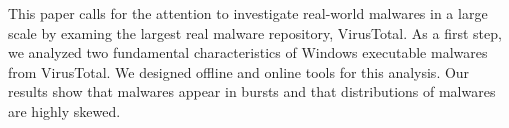 This paper calls for the attention to investigate real-world malwares in a large scale
by examing the largest real malware repository, VirusTotal.
As a first step, we analyzed two fundamental characteristics of Windows executable malwares from VirusTotal. 
We designed offline and online tools for this analysis.
Our results show that malwares appear in bursts and that distributions of malwares are highly skewed. 
